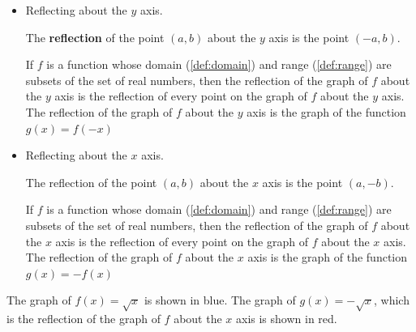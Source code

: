 \begin{itemize}
  \label{item:reflecting}

  \item Reflecting about the $y$ axis.

    The \textbf{reflection} of the point $(a, b)$ about the $y$ axis is the
    point $(-a, b)$.

    \begin{marginfigure}
      \centering
      \label{fig:reflecting_1}
    \end{marginfigure}

    If $f$ is a function whose domain (\ref{def:domain}) and range
    (\ref{def:range}) are subsets of the set of real numbers, then the
    reflection of the graph of $f$ about the $y$ axis is the reflection of
    every point on the graph of $f$ about the $y$ axis. The reflection of the
    graph of $f$ about the $y$ axis is the graph of the function $g(x) = f(-x)$

  \item Reflecting about the $x$ axis.

    The reflection of the point $(a, b)$ about the $x$ axis is the point
    $(a, -b)$.

    \begin{marginfigure}
      \centering
      \label{fig:reflecting_2}
    \end{marginfigure}

    If $f$ is a function whose domain (\ref{def:domain}) and range
    (\ref{def:range}) are subsets of the set of real numbers, then the
    reflection of the graph of $f$ about the $x$ axis is the reflection of every
    point on the graph of $f$ about the $x$ axis. The reflection of the graph of
    $f$ about the $x$ axis is the graph of the function $g(x) = -f(x)$
\end{itemize}

\begin{example}
  \label{exm:reflecting}

  The graph of $f(x) = \sqrt{x}$ is shown in blue. The graph of $g(x) =
  -\sqrt{x}$, which is the reflection of the graph of $f$ about the $x$ axis is
  shown in red.
\end{example}

\begin{marginfigure}
  \centering
  \label{fig:reflecting_3}
\end{marginfigure}

